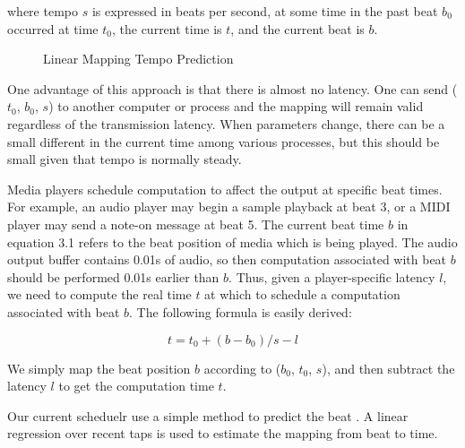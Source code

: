 where tempo $s$ is expressed in beats per second, at some time in the past beat $b_0$
occurred at time $t_0$, the current time is $t$, and the current beat is $b$.

\begin{figure}[H]
\caption{Linear Mapping Tempo Prediction \cite{Dawen:ISMIR2011}}
\label{fig:speciation}
\end{figure}

One advantage of this approach is that there is almost no latency.
One can send ($t_0$, $b_0$, $s$) to another computer or process and the 
mapping will remain valid regardless of the transmission latency. 
When parameters change, there can be a small different in the current 
time among various processes, but this should be small given that tempo 
is normally steady.

Media players schedule computation to affect the output at specific beat
times. For example, an audio player may begin a sample playback at beat 3, or a
MIDI player may send a note-on message at beat 5. The current beat time $b$ in 
equation 3.1 refers to the beat position of media which is being played.
The audio output buffer contains 0.01s of audio, so then computation associated 
with beat $b$ should be performed 0.01s earlier than $b$. Thus, given a 
player-specific latency $l$, we need to compute the real time $t$ at which to 
schedule a computation associated
with beat $b$. The following formula is easily derived:

\begin{equation}
t = t_0 + (b - b_0) / s - l
\end{equation}

We simply map the beat position $b$ according to ($b_0$, $t_0$, $s$), and then subtract the
latency $l$ to get the computation time $t$.

Our current scheduelr use a simple method to predict the beat . 
A linear regression over recent taps is used to estimate the
mapping from beat to time. 

